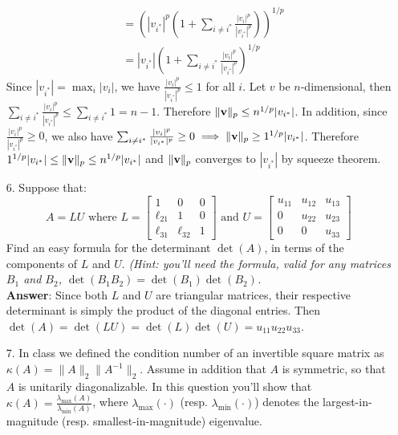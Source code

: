 \documentclass{article}
\newcommand{\bv}{{\bf v}}
\begin{document}
\begin{itemize}
\begin{align*}
                              & = \left(|v_{i^{*}}|^{p}\left( 1 + \sum_{i\neq i^{*}}\frac{|v_i|^{p}}{|v_{i^{*}}|^{p}}\right)\right)^{1/p} \\
                              & = |v_{i^{*}}|\left( 1 + \sum_{i\neq i^{*}}\frac{|v_i|^{p}}{|v_{i^{*}}|^{p}}\right)^{1/p}
            \end{align*}
            Since $|v_{i^{*}}| = \max_{i} |v_i|$, we have $\frac{|v_i|^{p}}{|v_{i^{*}}|^{p}}\leq 1$ for all $i$. Let $v$ be $n$-dimensional, then $\sum_{i\neq i^{*}}\frac{|v_i|^{p}}{|v_{i^{*}}|^{p}}\leq\sum_{i\neq i^{*}} 1=n-1$. Therefore $\|\bv\|_{p}\leq n^{1/p}|v_{i^{*}}|$. In addition, since $\frac{|v_i|^{p}}{|v_{i^{*}}|^{p}}\geq 0$, we also have $\sum_{i\neq i^{*}}\frac{|v_i|^{p}}{|v_{i^{*}}|^{p}}\geq 0\implies\|\bv\|_{p}\geq 1^{1/p}|v_{i^{*}}|$. Therefore $1^{1/p}|v_{i^{*}}|\leq\|\bv\|_{p}\leq n^{1/p}|v_{i^{*}}|$ and $\|\bv\|_{p}$ converges to $|v_{i^{*}}|$ by squeeze theorem.
      \item [6.] Suppose that: $$A = LU \text{ where } L  = \left[\begin{matrix} 1 & 0 & 0 \\ \ell_{21} & 1 & 0 \\ \ell_{31} & \ell_{32} & 1 \end{matrix}\right] \text{ and } U = \left[\begin{matrix} u_{11} & u_{12} & u_{13} \\ 0 & u_{22} & u_{23} \\ 0 & 0 & u_{33} \end{matrix}\right]$$ Find an easy formula for the determinant $\det(A)$, in terms of the components of $L$ and $U$. {\em (Hint: you'll need the formula, valid for any matrices $B_1$ and $B_2$, $\det(B_1B_2) = \det(B_1)\det(B_2)$.}\\
            \textbf{Answer}: Since both $L$ and $U$ are triangular matrices, their respective determinant is simply the product of the diagonal entries. Then $\det(A)=\det(LU)=\det(L)\det(U)=u_{11}u_{22}u_{33}$.
      \item [7.] In class we defined the condition number of an invertible square matrix as $\kappa(A) = \|A\|_2\|A^{-1}\|_2$. Assume in addition that $A$ is symmetric, so that $A$ is unitarily diagonalizable. In this question you'll show that $\kappa(A) = \frac{\lambda_{\max}(A)}{\lambda_{\min}(A)}$, where $\lambda_{\max}(\cdot)$ (resp. $\lambda_{\min}(\cdot)$) denotes the largest-in-magnitude (resp. smallest-in-magnitude) eigenvalue.
            \begin{itemize}

\end{itemize}
\end{itemize}
\end{document}
